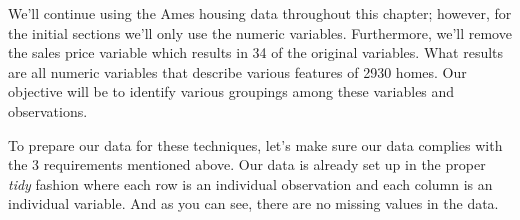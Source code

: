 \documentclass[]{book}
\newenvironment{Shaded}{\begin{snugshade}}{\end{snugshade}}
\newcommand{\CommentTok}[1]{\textcolor[rgb]{0.56,0.35,0.01}{\textit{#1}}}
\newcommand{\KeywordTok}[1]{\textcolor[rgb]{0.13,0.29,0.53}{\textbf{#1}}}
\newcommand{\NormalTok}[1]{#1}
\newcommand{\OperatorTok}[1]{\textcolor[rgb]{0.81,0.36,0.00}{\textbf{#1}}}
\newcommand{\StringTok}[1]{\textcolor[rgb]{0.31,0.60,0.02}{#1}}
\theoremstyle{definition}
\theoremstyle{definition}
\theoremstyle{definition}
\theoremstyle{remark}
\begin{document}
We'll continue using the Ames housing data throughout this chapter;
however, for the initial sections we'll only use the numeric variables.
Furthermore, we'll remove the sales price variable which results in 34
of the original variables. What results are all numeric variables that
describe various features of 2930 homes. Our objective will be to
identify various groupings among these variables and observations.

\begin{Shaded}
\end{Shaded}

To prepare our data for these techniques, let's make sure our data
complies with the 3 requirements mentioned above. Our data is already
set up in the proper \emph{tidy} fashion where each row is an individual
observation and each column is an individual variable. And as you can
see, there are no missing values in the data.
\end{document}
